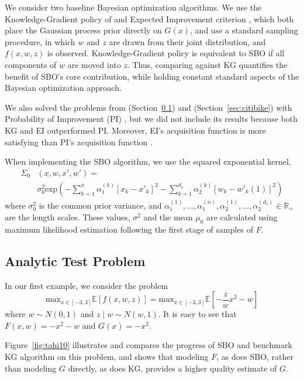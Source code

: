 \documentclass{article}
\newcommand{\w}{w}
\newcommand{\z}{z}
\begin{document}
We consider two baseline Bayesian optimization algorithms. We use the Knowledge-Gradient policy of \cite{frazier2009knowledge} and Expected Improvement criterion \cite{jones1998efficient}, which both place the Gaussian process prior directly on $G(x)$, and use a standard sampling procedure, in which $\w$ and $\z$ are drawn from their joint distribution, and $f(x,\w,\z)$ is observed. Knowledge-Gradient policy is equivalent to SBO if all components of $\w$ are moved into $\z$.  Thus, comparing against KG quantifies the benefit of SBO's core contribution, while holding constant standard aspects of the Bayesian optimization approach. 

We also solved the problems from (Section~\ref{sec:test}) and (Section~\ref{sec:citibike}) with Probability of Improvement (PI) \cite{brochu2010tutorial}, but we did not include its results because both KG and EI outperformed PI. Moreover, EI's acquisition function is more satisfying than PI's acquisition function \cite{brochu2010tutorial}. 

When implementing the SBO algorithm, we use the squared exponential kernel,
\begin{align*}
\Sigma_{0}&\left(x,\w,x',\w'\right)=\\  
&\sigma_{0}^{2}\mbox{exp}\left(-\sum_{k=1}^{n}\alpha_{1}^{\left(k\right)}\left[x_{k}-x'_{k}\right]^{2}-\sum_{k=1}^{d_{1}}\alpha_{2}^{\left(k\right)}\left[\w_{k}-\w'_{k}\left(1\right)\right]^{2}\right)
\end{align*}
where $\sigma_{0}^{2}$ is the common prior variance, and $\alpha_{1}^{\left(1\right)},\ldots,\alpha_{1}^{\left(n\right)},\alpha_{2}^{\left(1\right)},\ldots,\alpha_{2}^{\left(d_{1}\right)}\in\mathbb{R}_{+}$
are the length scales. These values, $\sigma^{2}$ and the mean $\mu_{0}$ are calculated using maximum likelihood estimation following the first stage of samples of $F$.

\subsection{Analytic Test Problem}
\label{sec:test}
In our first example, we consider the problem
\[
\mbox{max}_{x\in\left[-3,3\right]}\mathbb{E}\left[f\left(x,\w,\z\right)\right]=\mbox{max}_{x\in\left[-3,3\right]}\mathbb{E}\left[-\frac{\z}{\w}x^{2}-\w\right]
\]
where $\w\sim N\left(0,1\right)$ and $\z\mid \w\sim N\left(\w,1\right)$. It is easy to see that $F\left(x,\w \right)=-x^{2}-\w$ and $G(x)=-x^{2}$.

Figure~\ref{fig:tahi10} illustrates and compares the progress of SBO and benchmark KG algorithm on this problem, and shows that modeling $F$, as does SBO, rather than modeling $G$ directly, as does KG, provides a higher quality estimate of $G$.
\end{document}
